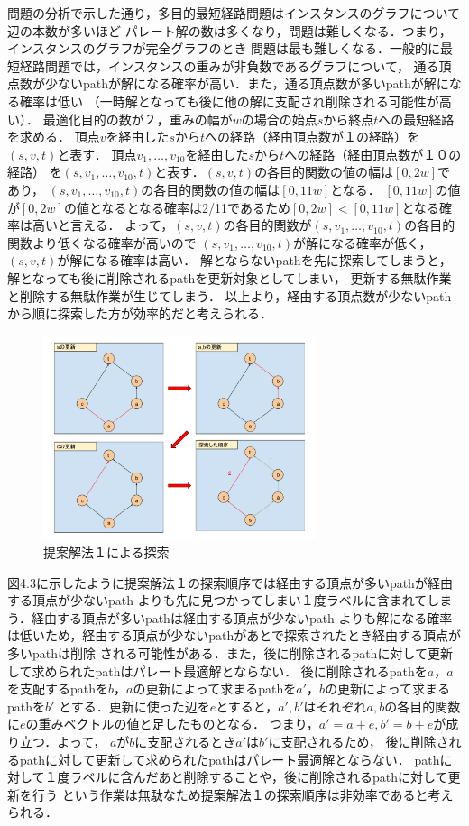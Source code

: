 \documentclass[12pt]{optlab-bachelor}
\begin{document}
問題の分析で示した通り，多目的最短経路問題はインスタンスのグラフについて辺の本数が多いほど
パレート解の数は多くなり，問題は難しくなる．つまり，インスタンスのグラフが完全グラフのとき
問題は最も難しくなる．一般的に最短経路問題では，インスタンスの重みが非負数であるグラフについて，
通る頂点数が少ないpathが解になる確率が高い．また，通る頂点数が多いpathが解になる確率は低い
（一時解となっても後に他の解に支配され削除される可能性が高い）．
最適化目的の数が２，重みの幅が$w$の場合の始点$s$から終点$t$への最短経路を求める．
頂点$v$を経由した$s$から$t$への経路（経由頂点数が１の経路）を$(s,v,t)$と表す．
頂点$v_1,\ldots,v_10$を経由した$s$から$t$への経路（経由頂点数が１０の経路）
を$(s,v_1,\ldots,v_10,t)$と表す．$(s,v,t)$の各目的関数の値の幅は$[0,2w]$であり，
$(s,v_1,\ldots,v_10,t)$の各目的関数の値の幅は$[0,11w]$となる．
$[0,11w]$の値が$[0,2w]$の値となるとなる確率は2/11であるため$[0,2w]<[0,11w]$となる確率は高いと言える．
よって，$(s,v,t)$の各目的関数が$(s,v_1,\ldots,v_10,t)$の各目的関数より低くなる確率が高いので
$(s,v_1,\ldots,v_10,t)$が解になる確率が低く，$(s,v,t)$が解になる確率は高い．
解とならないpathを先に探索してしまうと，解となっても後に削除されるpathを更新対象としてしまい，
更新する無駄作業と削除する無駄作業が生じてしまう．
以上より，経由する頂点数が少ないpathから順に探索した方が効率的だと考えられる．


\begin{figure}[htbp]
  \centering
  \caption{提案解法１による探索}
  \includegraphics[height=6.0cm, width=8.0cm]{fig/fig6.pdf}
\end{figure}

図4.3に示したように提案解法１の探索順序では経由する頂点が多いpathが経由する頂点が少ないpath
よりも先に見つかってしまい１度ラベルに含まれてしまう．経由する頂点が多いpathは経由する頂点が少ないpath
よりも解になる確率は低いため，経由する頂点が少ないpathがあとで探索されたとき経由する頂点が多いpathは削除
される可能性がある．また，後に削除されるpathに対して更新して求められたpathはパレート最適解とならない．
後に削除されるpathを$a$，$a$を支配するpathを$b$，$a$の更新によって求まるpathを$a'$，$b$の更新によって求まるpathを$b'$
とする．更新に使った辺を$e$とすると，$a',b'$はそれぞれ$a,b$の各目的関数に$e$の重みベクトルの値と足したものとなる．
つまり，$a'=a+e,b'=b+e$が成り立つ．よって， $a$が$b$に支配されるとき$a'$は$b'$に支配されるため，
後に削除されるpathに対して更新して求められたpathはパレート最適解とならない．
pathに対して１度ラベルに含んだあと削除することや，後に削除されるpathに対して更新を行う
という作業は無駄なため提案解法１の探索順序は非効率であると考えられる．
\end{document}
